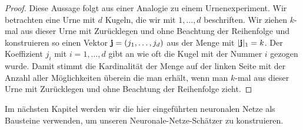 \begin{proof}
Diese Aussage folgt aus einer Analogie zu einem Urnenexperiment. Wir betrachten eine Urne mit $d$ Kugeln, die wir mit $1,\dots,d$ beschriften. Wir ziehen $k$-mal aus dieser Urne mit Zurücklegen und ohne Beachtung der Reihenfolge und konstruieren so einen Vektor $\mathbf{j} = (j_1,\dots,j_d)$ aus der Menge mit $|\mathbf{j}|_1 = k$. Der Koeffizient $j_i$ mit $i= 1,\dots,d$ gibt an wie oft die Kugel mit der Nummer $i$ gezogen wurde. Damit stimmt die Kardinalität der Menge auf der linken Seite mit der Anzahl aller Möglichkeiten überein die man erhält, wenn man $k$-mal aus dieser Urne mit Zurücklegen und ohne Beachtung der Reihenfolge zieht.
\end{proof}

Im nächsten Kapitel werden wir die hier eingeführten neuronalen Netze als Bausteine verwenden, um unseren Neuronale-Netze-Schätzer zu konstruieren.